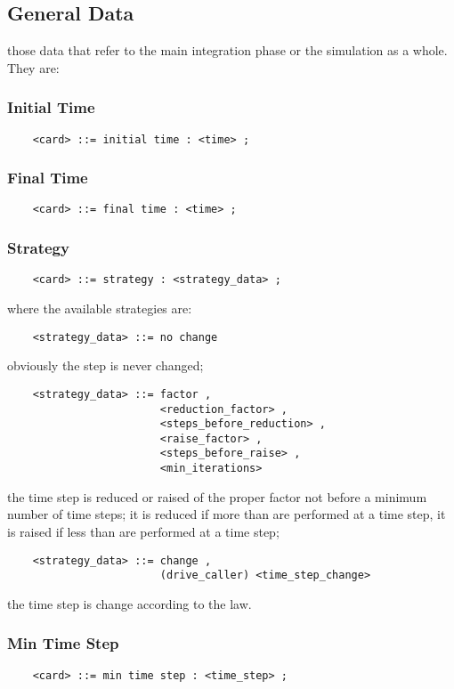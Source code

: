 \subsection{General Data}
those data that refer to the main integration phase or the simulation as a
whole. They are:

\subsubsection{Initial Time}
\begin{verbatim}
    <card> ::= initial time : <time> ;
\end{verbatim}

\subsubsection{Final Time}
\begin{verbatim}
    <card> ::= final time : <time> ;
\end{verbatim}

\subsubsection{Strategy}
\begin{verbatim}
    <card> ::= strategy : <strategy_data> ;
\end{verbatim}
where the available strategies are:
\begin{verbatim}
    <strategy_data> ::= no change 
\end{verbatim}
obviously the step is never changed;
\begin{verbatim}
    <strategy_data> ::= factor , 
                        <reduction_factor> ,
                        <steps_before_reduction> ,
                        <raise_factor> ,
                        <steps_before_raise> ,
                        <min_iterations>
\end{verbatim}
the time step is reduced or raised of the proper factor not before a
minimum number of time steps; it is reduced if more than 
 are performed at a time step, it is raised if less
than  are performed at a time step;
\begin{verbatim}
    <strategy_data> ::= change , 
                        (drive_caller) <time_step_change>
\end{verbatim}
the time step is change according to the  law.

\subsubsection{Min Time Step}
\begin{verbatim}
    <card> ::= min time step : <time_step> ;
\end{verbatim}

